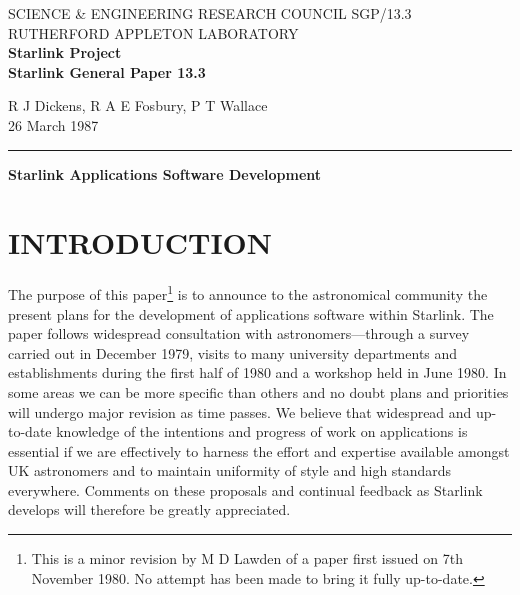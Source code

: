 \setlength{\textwidth}{153mm}
\setlength{\textheight}{220mm}
\setlength{\oddsidemargin}{3mm}
\setlength{\evensidemargin}{3mm}
\pagestyle{myheadings}


\thispagestyle{plain}
\noindent
SCIENCE \& ENGINEERING RESEARCH COUNCIL \hfill SGP/13.3\\
RUTHERFORD APPLETON LABORATORY\\
{\large\bf Starlink Project\\}
{\large\bf Starlink General Paper 13.3}
\begin{flushright}
R J Dickens, R A E Fosbury, P T Wallace\\
26 March 1987
\end{flushright}
\vspace{-4mm}
\rule{\textwidth}{0.5mm}
\vspace{10mm}
\begin{center}
{\Large\bf Starlink Applications Software Development}
\end{center}
\vspace{10mm}
\section {INTRODUCTION}
The purpose of this paper\footnote{This is a minor revision by M D Lawden of a
paper first issued on 7th November 1980. No attempt has been made to bring it
fully up-to-date.} is to announce to the astronomical community the
present plans for the development of applications software within Starlink.
The paper follows widespread consultation with astronomers---through a survey
carried out in December 1979, visits to many university departments and
establishments during the first half of 1980 and a workshop held in June 1980.
In some areas we can be more specific than others and no doubt plans and
priorities will undergo major revision as time passes.
We believe that widespread and up-to-date knowledge of the intentions and
progress of work on applications is essential if we are effectively to harness
the effort and expertise available amongst UK astronomers and to maintain
uniformity of style and high standards everywhere.
Comments on these proposals and continual feedback as Starlink develops will
therefore be greatly appreciated.

